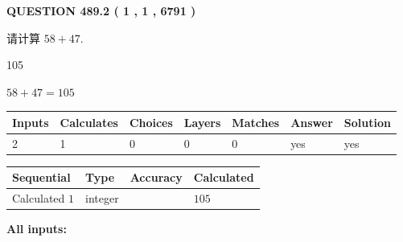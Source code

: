 \documentclass{ctexart}
\begin{document}
   
  
\vspace{0.2in}
  
{\textbf{\Large{QUESTION
489.2 
 ( 1 , 1 , 6791 )
}}}
  
  
 
请计算 $ %
58 +  %
47 $.
 
 
 
\noindent{}
 
 

105
 
 
\noindent{}
 
 

 
 
 
\noindent{}
 
 

$ %
58 +  %
47=   %
105$
 
 
\noindent{}
 
 

 
   
   
   
   
\noindent\begin{tabular}{|l|l|l|l|l|l|l|}
 \hline
Inputs & Calculates & Choices & Layers & Matches & Answer & Solution \\ \hline
 2  & 
 1  & 
 0
  & 
 0  & 
 0  & 
  yes & 
  yes 
  \\ \hline
 \end{tabular}
   
   
   
   
\noindent{}
   
   
  
  
\noindent\begin{tabular}{|l|l|l|l|}
\hline
 Sequential & Type & Accuracy & Calculated \\ 
\hline
 
 
  Calculated $  1 $ & integer &  & 
  $ 105 $ 
 \\  \hline  
 \end{tabular}
   
   
   
   
\noindent\vspace{0.1in}\hspace{-0.08in} {\textbf{\Large{All inputs: }}}
   
\end{document}
